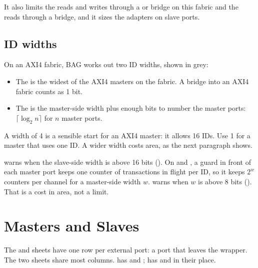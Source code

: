 It also limits the reads and writes through a  or 
bridge on this fabric and the reads through a  bridge, and it sizes
the adapters on slave ports.

\subsection{ID widths}
\label{sec:wb-ids}

On an AXI4 fabric, BAG works out two ID widths, shown in grey:

\begin{itemize}
\item The  is the widest  of the AXI4
  masters on the fabric. A bridge into an AXI4 fabric counts as 1 bit.
\item The  is the master-side width plus enough bits to
  number the master ports: $\lceil\log_2 n\rceil$ for $n$ master ports.
\end{itemize}

A width of 4 is a sensible start for an AXI4 master: it allows 16 IDs. Use 1 for a
master that uses one ID. A wider width costs area, as the next paragraph shows.

 warns when the slave-side width is above 16 bits
(). On  and , a guard
in front of each master port keeps one counter of transactions in flight per ID, so it
keeps $2^w$ counters per channel for a master-side width $w$.  warns when
$w$ is above 8 bits (). That is a cost in area, not a limit.

\section{Masters and Slaves}
\label{sec:wb-ports}

The  and  sheets have one row per external port: a port
that leaves the wrapper. The two sheets share most columns.  has
 and ;  has
 and  in their place.

